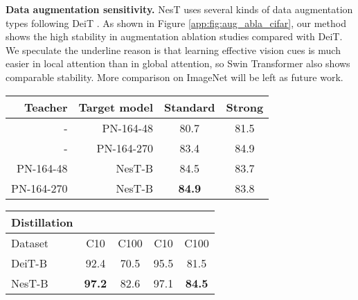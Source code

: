\documentclass{article}
\newcommand{\cmark}{\ding{51}}\newcommand{\xmark}{\text{\ding{55}}}
\newcommand{\topic}[1]{\noindent \textbf{#1}}
\newcommand{\OURS}{NesT\xspace}
\begin{document}
\topic{Data augmentation sensitivity.}
\OURS uses several kinds of data augmentation types following DeiT \cite{touvron2020training}.
As shown in Figure \ref{app:fig:aug_abla_cifar}, our method shows the high stability in augmentation ablation studies compared with DeiT. We speculate the underline reason is that learning effective vision cues is much easier in local attention than in global attention, so Swin Transformer also shows comparable stability. More comparison on ImageNet will be left as future work. 

\begin{table*}[h]
    \caption{Teacher distillation studies on CIFAR datasets. Left: The top two rows of the table are teacher supervised accuracy on CIFAR100. The bottom two rows show accuracy using these trained teachers with standard or strong augmentation. Right: Teacher (PN-164-48 with standard augmentation) distillation effects on DeiT and the proposed \OURS. DeiT and \OURS are always trained with strong augmentation.} \label{app:tab:distill}
    
    \begin{minipage}[b]{0.55\textwidth}
        \vspace{.2cm}
        \setlength{\tabcolsep}{4.5pt}
        \centering
        \begin{tabular}{r|rcc}
         \toprule           
           Teacher             &   Target model    & Standard        & Strong \\ \midrule
           
               -     &      PN-164-48               &  80.7                   &  81.5     \\
               -       &      PN-164-270              & 83.4                   &  84.9          \\\midrule 
               PN-164-48       &   \OURS-B       & 84.5                   &  83.7\\
               PN-164-270         &   \OURS-B       & \textbf{84.9}        &  83.8 \\  \bottomrule
        \end{tabular}
    \end{minipage}
    \begin{minipage}[b]{0.45\textwidth}
        \setlength{\tabcolsep}{4.5pt}
        \centering
        \begin{tabular}{l|cc|cc}
         \toprule
           Distillation             &  \multicolumn{2}{c}{\xmark} & \multicolumn{2}{c}{\cmark}  \\ \midrule
           Dataset      &    C10                & C100        & C10 & C100              \\ \midrule
           DeiT-B       &   92.4   & 70.5       & 95.5       & 81.5           \\
           \OURS-B   &   \textbf{97.2}  & 82.6        & 97.1       & \textbf{84.5}           \\ \bottomrule
        \end{tabular}
    \end{minipage}
\end{table*} 
\end{document}
